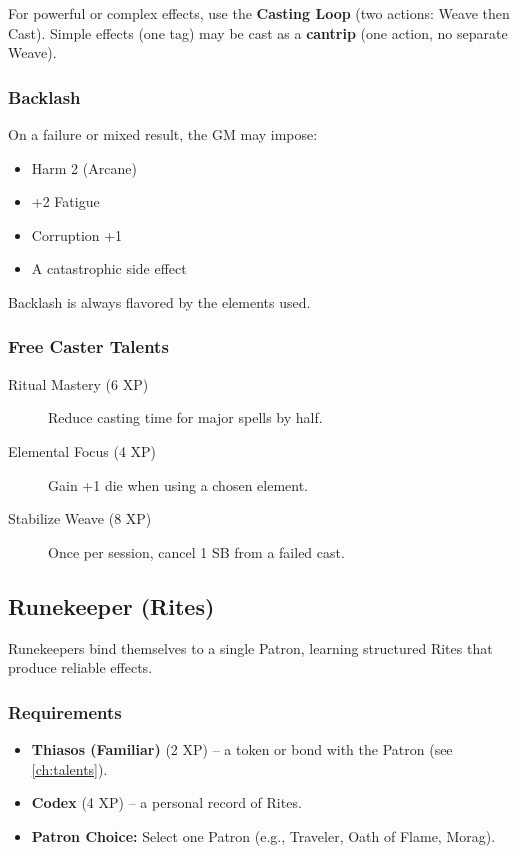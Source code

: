 For powerful or complex effects, use the \textbf{Casting Loop} (two actions: Weave then Cast). Simple effects (one tag) may be cast as a \textbf{cantrip} (one action, no separate Weave).

\subsubsection*{Backlash}
\label{sec:free-caster-backlash}
On a failure or mixed result, the GM may impose:
\begin{itemize}
  \item Harm 2 (Arcane)
  \item +2 Fatigue
  \item Corruption +1
  \item A catastrophic side effect
\end{itemize}
Backlash is always flavored by the elements used.

\subsubsection*{Free Caster Talents}
\label{sec:free-caster-talents}
\begin{description}
  \item[Ritual Mastery (6 XP)] Reduce casting time for major spells by half.
  \item[Elemental Focus (4 XP)] Gain +1 die when using a chosen element.
  \item[Stabilize Weave (8 XP)] Once per session, cancel 1 SB from a failed cast.
\end{description}

\subsection{Runekeeper (Rites)}
\label{sec:runekeeper}

Runekeepers bind themselves to a single Patron, learning structured Rites that produce reliable effects.

\subsubsection*{Requirements}
\begin{itemize}
  \item \textbf{Thiasos (Familiar)} (2 XP) – a token or bond with the Patron (see \ref{ch:talents}).
  \item \textbf{Codex} (4 XP) – a personal record of Rites.
  \item \textbf{Patron Choice:} Select one Patron (e.g., Traveler, Oath of Flame, Morag).
\end{itemize}

